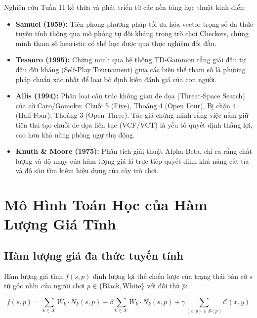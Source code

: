 \documentclass[11pt,a4paper]{article}
\begin{document}
Nghiên cứu Tuần 11 kế thừa và phát triển từ các nền tảng học thuật kinh điển:
\begin{itemize}
    \item \textbf{Samuel (1959):} Tiên phong phương pháp tối ưu hóa vector trọng số đa thức tuyến tính thông qua mô phỏng tự đối kháng trong trò chơi Checkers, chứng minh tham số heuristic có thể học được qua thực nghiệm đối đầu.
    \item \textbf{Tesauro (1995):} Chứng minh qua hệ thống TD-Gammon rằng giải đấu tự đấu đối kháng (Self-Play Tournament) giữa các biến thể tham số là phương pháp chuẩn xác nhất để loại bỏ định kiến đánh giá của con người.
    \item \textbf{Allis (1994):} Phân loại cấu trúc không gian đe dọa (Threat-Space Search) của cờ Caro/Gomoku: Chuỗi 5 (Five), Thoáng 4 (Open Four), Bị chặn 4 (Half Four), Thoáng 3 (Open Three). Tác giả chứng minh rằng việc nắm giữ tiên thủ tạo chuỗi đe dọa liên tục (VCF/VCT) là yếu tố quyết định thắng lợi, cao hơn khả năng phòng ngự thụ động.
    \item \textbf{Knuth \& Moore (1975):} Phân tích giải thuật Alpha-Beta, chỉ ra rằng chất lượng và độ nhạy của hàm lượng giá lá trực tiếp quyết định khả năng cắt tỉa và độ sâu tìm kiếm hiệu dụng của cây trò chơi.
\end{itemize}

\section{Mô Hình Toán Học của Hàm Lượng Giá Tĩnh}

\subsection{Hàm lượng giá đa thức tuyến tính}
Hàm lượng giá tĩnh $f(s, p)$ định lượng lợi thế chiến lược của trạng thái bàn cờ $s$ từ góc nhìn của người chơi $p \in \{\text{Black}, \text{White}\}$ với đối thủ $\bar{p}$:

\begin{equation}
f(s, p) = \sum_{k \in \mathcal{K}} W_k \cdot N_k(s, p) - \beta \sum_{k \in \mathcal{K}} W_k \cdot N_k(s, \bar{p}) + \gamma \sum_{(x, y) \in \mathcal{S}(p)} \mathcal{C}(x, y)
\label{eq:heuristic}
\end{equation}
\end{document}
